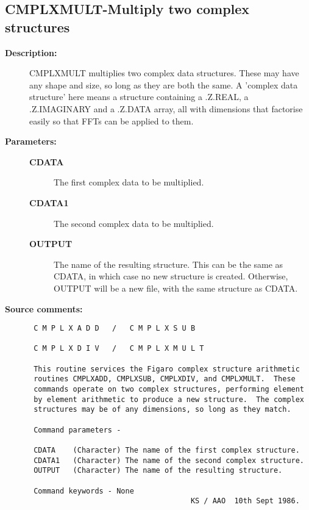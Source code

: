 \subsection{CMPLXMULT-\label{CMPLXMULT}Multiply two complex structures}
\begin{description}

\item [{\bf Description:}]
 CMPLXMULT multiplies two complex data structures.  These  may
 have any shape and size, so long as they are both the same.  A
 'complex data structure' here means a structure containing a
 .Z.REAL, a .Z.IMAGINARY and a .Z.DATA array, all with dimensions
 that factorise easily so that FFTs can be applied to them.

\item [{\bf Parameters:}]
\begin{description}
\item [{\bf CDATA}]
 The first complex data to be multiplied.
\item [{\bf CDATA1}]
 The second complex data to be multiplied.
\item [{\bf OUTPUT}]
 The name of the resulting structure. This can
 be the same as CDATA, in which case no new structure is
 created.  Otherwise, OUTPUT will be a new file, with the
 same structure as CDATA.
\end{description}

\item [{\bf Source comments:}]
\begin{verbatim}
 C M P L X A D D   /   C M P L X S U B

 C M P L X D I V   /   C M P L X M U L T

 This routine services the Figaro complex structure arithmetic
 routines CMPLXADD, CMPLXSUB, CMPLXDIV, and CMPLXMULT.  These
 commands operate on two complex structures, performing element
 by element arithmetic to produce a new structure.  The complex
 structures may be of any dimensions, so long as they match.

 Command parameters -

 CDATA    (Character) The name of the first complex structure.
 CDATA1   (Character) The name of the second complex structure.
 OUTPUT   (Character) The name of the resulting structure.

 Command keywords - None
                                     KS / AAO  10th Sept 1986.
\end{verbatim}
\end{description}
